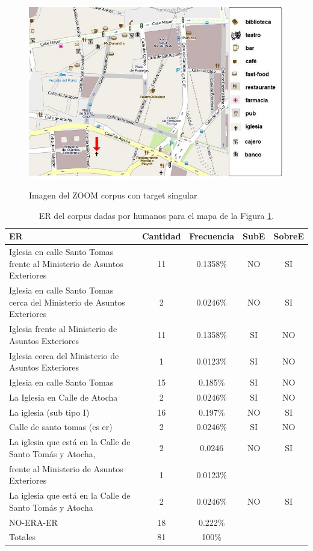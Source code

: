 \begin{figure}
\centering
\includegraphics[width=\textwidth]{images/corpus/mapa6.png}\\[0pt]
\caption{Imagen del ZOOM corpus con target singular}
\label{mapa-zoom}
\end{figure}


\begin{table}[h!]
\begin{small}
\begin{center}
\begin{tabular}{|l|c|c|c|c|}
\hline
ER 					      & Cantidad &  Frecuencia & SubE & SobreE\\ \hline \hline
Iglesia en calle Santo Tomas frente al Ministerio de Asuntos Exteriores        &	11	&	0.1358\% & NO &SI\\ \hline
Iglesia en calle Santo Tomas cerca del Ministerio de Asuntos Exteriores        &	2   &	0.0246\% &	NO&SI\\ \hline
Iglesia  frente al Ministerio de Asuntos Exteriores &11&0.1358\% &SI&NO\\ \hline
Iglesia cerca del Ministerio de Asuntos Exteriores&1&0.0123\% &SI&NO\\ \hline
Iglesia en calle Santo Tomas&15&0.185\% &SI&NO\\ \hline
La Iglesia en Calle de Atocha&2&0.0246\% &SI&NO\\ \hline
La iglesia (sub tipo I)&16&0.197\% &NO&SI\\ \hline
Calle de santo tomas  (es er)&2&0.0246\% &SI&NO\\ \hline
La iglesia que est\'a en la Calle de Santo Tom\'as y Atocha, & 2&0.0246 &NO&SI\\ 
frente al Ministerio de Asuntos Exteriores&1&0.0123\% & &\\ \hline
La iglesia que est\'a en la Calle de Santo Tom\'as y Atocha&2&0.0246\% &NO&SI\\ \hline
NO-ERA-ER&18&0.222\% & &\\ \hline \hline
Totales&81&100\% & &\\
\hline
\end{tabular}
\caption{ER del corpus dadas por humanos para el mapa de la Figura \ref{mapa-zoom}.}\label{freq-mapa}
\end{center}
\end{small}
\end{table}

